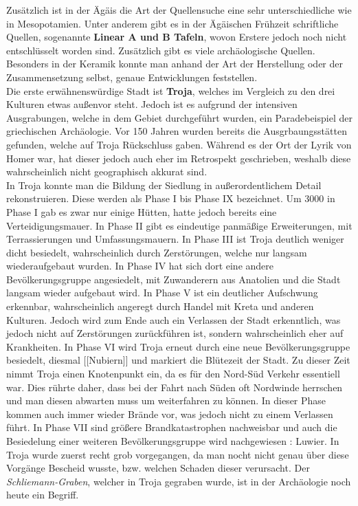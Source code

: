 \documentclass{article}
\begin{document}
	Zusätzlich ist in der Ägäis die Art der Quellensuche eine sehr unterschiedliche wie in Mesopotamien. Unter anderem gibt es in der Ägäischen Frühzeit schriftliche Quellen, sogenannte \textbf{Linear A und B Tafeln}, wovon Erstere jedoch noch nicht entschlüsselt worden sind. Zusätzlich gibt es viele archäologische Quellen. Besonders in der Keramik konnte man anhand der Art der Herstellung oder der Zusammensetzung selbst, genaue Entwicklungen feststellen. \\
	Die erste erwähnenswürdige Stadt ist \textbf{Troja}, welches im Vergleich zu den drei Kulturen etwas außenvor steht. Jedoch ist es aufgrund der intensiven Ausgrabungen, welche in dem Gebiet durchgeführt wurden, ein Paradebeispiel der griechischen Archäologie. Vor 150 Jahren wurden bereits die Ausgrbaungsstätten gefunden, welche auf Troja Rückschluss gaben. Während es der Ort der Lyrik von Homer war, hat dieser jedoch auch eher im Retrospekt geschrieben, weshalb diese wahrscheinlich nicht geographisch akkurat sind. \\
	In Troja konnte man die Bildung der Siedlung in außerordentlichem Detail rekonstruieren. Diese werden als Phase I bis Phase IX bezeichnet. Um 3000 in Phase I gab es zwar nur einige Hütten, hatte jedoch bereits eine Verteidigungsmauer. In Phase II gibt es eindeutige panmäßige Erweiterungen, mit Terrassierungen und Umfassungsmauern. In Phase III ist Troja deutlich weniger dicht besiedelt, wahrscheinlich durch Zerstörungen, welche nur langsam wiederaufgebaut wurden. In Phase IV hat sich dort eine andere Bevölkerungsgruppe angesiedelt, mit Zuwanderern aus Anatolien und die Stadt langsam wieder aufgebaut wird. In Phase V ist ein deutlicher Aufschwung erkennbar, wahrscheinlich angeregt durch Handel mit Kreta und anderen Kulturen. Jedoch wird zum Ende auch ein Verlassen der Stadt erkenntlich, was jedoch nicht auf Zerstörungen zurückführen ist, sondern wahrscheinlich eher auf Krankheiten. In Phase VI wird Troja erneut durch eine neue Bevölkerungsgruppe besiedelt, diesmal [[Nubiern]] und markiert die Blütezeit der Stadt. Zu dieser Zeit nimmt Troja einen Knotenpunkt ein, da es für den Nord-Süd Verkehr essentiell war. Dies rührte daher, dass bei der Fahrt nach Süden oft Nordwinde herrschen und man diesen abwarten muss um weiterfahren zu können. In dieser Phase kommen auch immer wieder Brände vor, was jedoch nicht zu einem Verlassen führt. In Phase VII sind größere Brandkatastrophen nachweisbar und auch die Besiedelung einer weiteren Bevölkerungsgruppe wird nachgewiesen : Luwier. In Troja wurde zuerst recht grob vorgegangen, da man nocht nicht genau über diese Vorgänge Bescheid wusste, bzw. welchen Schaden dieser verursacht. Der \textit{Schliemann-Graben}, welcher in Troja gegraben wurde, ist in der Archäologie noch heute ein Begriff. \\ \\
	
\end{document}
